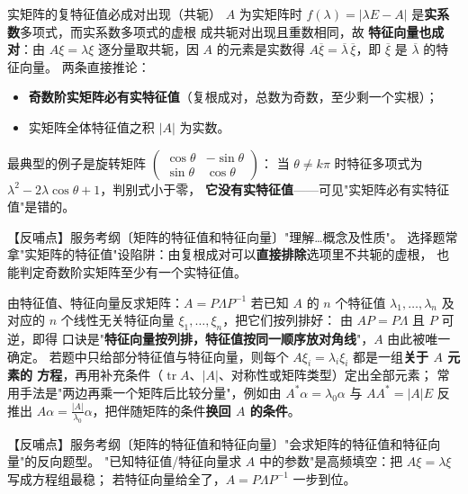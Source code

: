 \begin{fdeep}{实矩阵的复特征值必成对出现（共轭）}
$A$ 为实矩阵时 $f(\lambda)=\lvert\lambda E-A\rvert$ 是\textbf{实系数}多项式，而实系数多项式的虚根
成共轭对出现且重数相同，故
\textbf{特征向量也成对}：由 $A\xi=\lambda\xi$ 逐分量取共轭，因 $A$ 的元素是实数得
$A\overline{\xi}=\overline{\lambda}\,\overline{\xi}$，即 $\overline{\xi}$ 是 $\overline{\lambda}$ 的特征向量。
两条直接推论：
\begin{itemize}[leftmargin=2.2em,itemsep=0.22em]
\item \textbf{奇数阶实矩阵必有实特征值}（复根成对，总数为奇数，至少剩一个实根）；
\item 实矩阵全体特征值之积 $\lvert A\rvert$ 为实数。
\end{itemize}
最典型的例子是旋转矩阵 $\begin{pmatrix}\cos\theta&-\sin\theta\\ \sin\theta&\cos\theta\end{pmatrix}$：
当 $\theta\ne k\pi$ 时特征多项式为 $\lambda^{2}-2\lambda\cos\theta+1$，判别式小于零，
\textbf{它没有实特征值}——可见"实矩阵必有实特征值"是错的。

【反哺点】服务考纲〔矩阵的特征值和特征向量〕"理解…概念及性质"。
选择题常拿"实矩阵的特征值"设陷阱：由复根成对可以\textbf{直接排除}选项里不共轭的虚根，
也能判定奇数阶实矩阵至少有一个实特征值。
\end{fdeep}

\begin{fdeep}{由特征值、特征向量反求矩阵：$A=P\Lambda P^{-1}$}
若已知 $A$ 的 $n$ 个特征值 $\lambda_1,\dots,\lambda_n$ 及对应的 $n$ 个线性无关特征向量
$\xi_1,\dots,\xi_n$，把它们按列排好：
由 $AP=P\Lambda$ 且 $P$ 可逆，即得
口诀是"\textbf{特征向量按列排，特征值按同一顺序放对角线}"，$A$ 由此被唯一确定。
若题中只给部分特征值与特征向量，则每个 $A\xi_i=\lambda_i\xi_i$ 都是一组\textbf{关于 $A$ 元素的
方程}，再用补充条件（$\operatorname{tr}A$、$\lvert A\rvert$、对称性或矩阵类型）定出全部元素；
常用手法是"两边再乘一个矩阵后比较分量"，例如由 $A^{*}\alpha=\lambda_0\alpha$ 与 $AA^{*}=\lvert A\rvert E$
反推出 $A\alpha=\frac{\lvert A\rvert}{\lambda_0}\alpha$，把伴随矩阵的条件\textbf{换回 $A$ 的条件}。

【反哺点】服务考纲〔矩阵的特征值和特征向量〕"会求矩阵的特征值和特征向量"的反向题型。
"已知特征值/特征向量求 $A$ 中的参数"是高频填空：把 $A\xi=\lambda\xi$ 写成方程组最稳；
若特征向量给全了，$A=P\Lambda P^{-1}$ 一步到位。
\end{fdeep}

